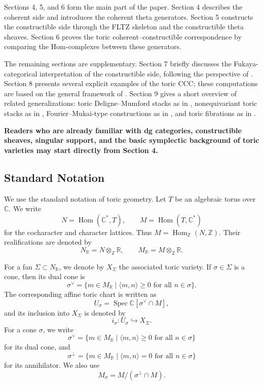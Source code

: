 Sections 4, 5, and 6 form the main part of the paper. Section 4 describes the coherent side and introduces the coherent theta generators. Section 5 constructs the constructible side through the FLTZ skeleton and the constructible theta sheaves. Section 6 proves the toric coherent--constructible correspondence by comparing the Hom-complexes between these generators.

The remaining sections are supplementary. Section 7 briefly discusses the Fukaya-categorical interpretation of the constructible side, following the perspective of \cite{FLTZ09}. Section 8 presents several explicit examples of the toric CCC; these computations are based on the general framework of \cite{FLTZ09}. Section 9 gives a short overview of related generalizations: toric Deligne--Mumford stacks as in \cite{FLTZDM}, nonequivariant toric stacks as in \cite{Kuw20}, Fourier--Mukai-type constructions as in \cite{FLTZFM}, and toric fibrations as in \cite{HuSuh23}.

\textbf{Readers who are already familiar with dg categories, constructible sheaves, singular support, and the basic symplectic background of toric varieties may start directly from Section 4.}
\subsection{Standard Notation}
We use the standard notation of toric geometry. Let \(T\) be an algebraic torus
over \(\mathbb{C}\). We write
\[
N=\operatorname{Hom}(\mathbb{C}^{*},T),
\qquad
M=\operatorname{Hom}(T,\mathbb{C}^{*})
\]
for the cocharacter and character lattices. Thus
\(M=\operatorname{Hom}_{\mathbb{Z}}(N,\mathbb{Z})\). Their realifications are
denoted by
\[
N_{\mathbb{R}}=N\otimes_{\mathbb{Z}}\mathbb{R},
\qquad
M_{\mathbb{R}}=M\otimes_{\mathbb{Z}}\mathbb{R}.
\]

For a fan \(\Sigma\subset N_{\mathbb{R}}\), we denote by \(X_{\Sigma}\) the
associated toric variety. If \(\sigma\in\Sigma\) is a cone, then its dual cone is
\[
\sigma^{\vee}
=
\{m\in M_{\mathbb{R}}\mid \langle m,n\rangle\ge 0
\text{ for all } n\in\sigma\}.
\]
The corresponding affine toric chart is written as
\[
U_{\sigma}=\operatorname{Spec}\mathbb{C}[\sigma^{\vee}\cap M],
\]
and its inclusion into \(X_{\Sigma}\) is denoted by
\[
i_{\sigma}:U_{\sigma}\hookrightarrow X_{\Sigma}.
\]
For a cone \(\sigma\), we write
\[
\sigma^\vee=\{m\in M_{\mathbb R}\mid \langle m,n\rangle\ge 0
\text{ for all }n\in\sigma\}
\]
for its dual cone, and
\[
\sigma^\perp=\{m\in M_{\mathbb R}\mid \langle m,n\rangle=0
\text{ for all }n\in\sigma\}
\]
for its annihilator. We also use
\[
M_\sigma=M/(\sigma^\perp\cap M).
\]




